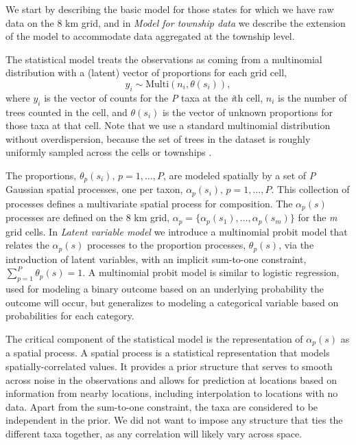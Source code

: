 \documentclass[10pt,letterpaper]{article}
\begin{document}
We start by describing the basic model for those states for which
we have raw data on the 8 km grid, and in \emph{Model for township data}
we describe the extension of the model to accommodate data aggregated
at the township level.

The statistical model treats the observations as coming from a multinomial
distribution with a (latent) vector of proportions for each grid cell,
\[
y_{i}\sim\mbox{Multi}(n_{i},\theta(s_{i})),
\]
where $y_{i}$ is the vector of counts for the  \emph{P} taxa at the \emph{i}th
cell, $n_{i}$ is the number of trees counted in the cell, and $\theta(s_{i})$
is the vector of unknown proportions for those taxa at that cell.
Note that we use a standard multinomial distribution without overdispersion,
because the set of trees in the dataset is roughly uniformly sampled
across the cells or townships \cite{goring2015composition}.

The proportions, $\theta_{p}(s_{i}),\, p=1,\ldots,P$, are modeled
spatially by a set of \emph{P} Gaussian spatial processes, one per taxon,
$\alpha_{p}(s_{i}),\, p=1,\ldots,P$. This collection of processes
defines a multivariate spatial process for composition. The $\alpha_{p}(s)$
processes are defined on the 8 km grid, $\alpha_{p}=\{\alpha_{p}(s_{1}),\ldots,\alpha_{p}(s_{m})\}$
for the \emph{m} grid cells. In  \emph{Latent variable model}
we introduce a multinomial probit model that relates the $\alpha_{p}(s)$
processes to the proportion processes, $\theta_{p}(s)$, via the introduction
of latent variables, with an implicit sum-to-one constraint, $\sum_{p=1}^{P}\theta_{p}(s)=1$.
A multinomial probit model is similar to logistic
regression, used for modeling a binary outcome based on an underlying
probability the outcome will occur, but generalizes to modeling a
categorical variable based on probabilities for each category. 



The critical component of the statistical model is the representation
of $\alpha_{p}(s)$ as a spatial process. A spatial
process is a statistical representation that models spatially-correlated
values. It provides a prior structure that serves to smooth across
noise in the observations and allows for prediction at locations based
on information from nearby locations, including interpolation to locations
with no data. Apart from the sum-to-one constraint, the taxa are considered
to be independent in the prior. We did not want to impose any structure
that ties the different taxa together, as any correlation will likely
vary across space.
\end{document}
